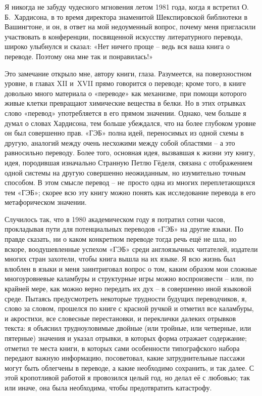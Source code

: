 \documentclass[../main.tex]{subfiles}
\begin{document}
Я никогда не забуду чудесного мгновения летом 1981 года, когда я встретил О.\,Б.~Хардисона, в то время директора знаменитой Шекспировской библиотеки в Вашингтоне, и он, в ответ на мой недоуменный вопрос, почему меня пригласили участвовать в конференции, посвященной искусству литературного перевода, широко улыбнулся и сказал: «Нет ничего проще \--- ведь вся ваша книга о переводе. Поэтому она мне так и понравилась!»

Это замечание открыло мне, автору книги, глаза. Разумеется, на поверхностном уровне, в главах XII и~XVII прямо говорится о переводе; кроме того, в книге довольно много материала о «переводе» как механизме, при помощи которого живые клетки превращают химические вещества в белки. Но в этих отрывках слово «перевод» употребляется в его прямом значении. Однако, чем больше я думал о словах Хардисона, тем больше убеждался, что на более глубоком уровне он был совершенно прав. «ГЭБ» полна идей, переносимых из одной схемы в другую, аналогий между очень несхожими между собой областями \--- а это равносильно переводу. Более того, основная идея, вызвавшая к жизни эту книгу, идея, породившая изначально Странную Петлю Гёделя, связана с отображением одной системы на другую совершенно неожиданным, но изумительно точным способом. В этом смысле перевод \--- не~просто одна из многих переплетающихся тем «ГЭБ»; скорее всю эту книгу можно понять как исследование перевода в его метафорическом значении.

Случилось так, что в 1980 академическом году я потратил сотни часов, прокладывая пути для потенциальных переводов «ГЭБ» на другие языки. По правде сказать, ни о каком конкретном переводе тогда речь ещё не шла, но вскоре, воодушевленные успехом «ГЭБ» среди англоязычных читателей, издатели многих стран захотели, чтобы книга вышла на их языке. Я всю жизнь был влюблен в языки и меня заинтриговал вопрос о том, каким образом мои сложные многоуровневые каламбуры и структурные игры можно воспроизвести \--- или, по крайней мере, как можно верно передать их дух \--- в совершенно иной языковой среде. Пытаясь предусмотреть некоторые трудности будущих переводчиков, я, слово за словом, прошелся по книге с красной ручкой и отметил все каламбуры, и акростихи, все словесные перестановки, и переклички далеких отрывков текста: я объяснил трудноуловимые двойные (или тройные, или четверные, или пятерные) значения и указал отрывки, в которых форма отражает содержание; отметил те места книги, в которых сами особенности типографского набора передают важную информацию, посоветовал, какие затруднительные пассажи могут быть облегчены в переводе, а какие необходимо сохранить, и так далее. С этой кропотливой работой я провозился целый год, но делал её с любовью; так или иначе, она была необходима, чтобы предотвратить катастрофу.
\end{document}
